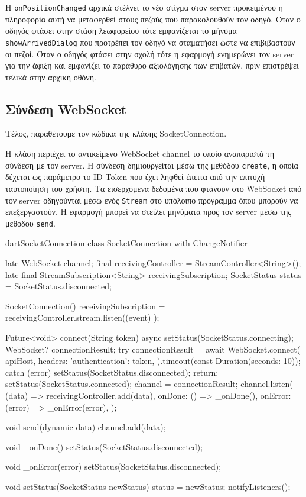 \documentclass[../thesis.tex]{subfiles}
\begin{document}
Η \texttt{on\-Position\-Changed} αρχικά στέλνει το νέο στίγμα στον server προκειμένου η πληροφορία αυτή να μεταφερθεί στους πεζούς που παρακολουθούν τον οδηγό.
Όταν ο οδηγός φτάσει στην στάση λεωφορείου τότε εμφανίζεται το μήνυμα \texttt{show\-Arrived\-Dialog} που προτρέπει τον οδηγό να σταματήσει ώστε να επιβιβαστούν οι πεζοί.
Όταν ο οδηγός φτάσει στην σχολή τότε η εφαρμογή ενημερώνει τον server για την άφιξη και εμφανίζει το παράθυρο αξιολόγησης των επιβατών, πριν επιστρέψει τελικά στην αρχική οθόνη.

\subsection{Σύνδεση WebSocket}

Τέλος, παραθέτουμε τον κώδικα της κλάσης SocketConnection.

\bigskip

Η κλάση περιέχει το αντικείμενο WebSocket channel το οποίο αναπαριστά τη σύνδεση με τον server.
Η σύνδεση δημιουργείται μέσω της μεθόδου \texttt{create}, η οποία δέχεται ως παράμετρο το ID Token που έχει ληφθεί έπειτα από την επιτυχή ταυτοποίηση του χρήστη.
Τα εισερχόμενα δεδομένα που φτάνουν στο WebSocket από τον server οδηγούνται μέσω ενός \texttt{Stream} στο υπόλοιπο πρόγραμμα όπου μπορούν να επεξεργαστούν.
Η εφαρμογή μπορεί να στείλει μηνύματα προς τον server μέσω της μεθόδου \texttt{send}.

\begin{codeblock}{dart}{SocketConnection}
  class SocketConnection with ChangeNotifier {
    late WebSocket channel;
    final receivingController = StreamController<String>();
    late final StreamSubscription<String> receivingSubscription;
    SocketStatus status = SocketStatus.disconnected;
  
    SocketConnection() {
      receivingSubscription = receivingController.stream.listen((event) {});
    }
  
    Future<void> connect(String token) async {
      setStatus(SocketStatus.connecting);
      WebSocket? connectionResult;
      try {
        connectionResult = await WebSocket.connect(
          apiHost,
          headers: {'authentication': token},
        ).timeout(const Duration(seconds: 10));
      } catch (error) {
        setStatus(SocketStatus.disconnected);
        return;
      }
      setStatus(SocketStatus.connected);
      channel = connectionResult;
      channel.listen(
        (data) => receivingController.add(data),
        onDone: () => _onDone(),
        onError: (error) => _onError(error),
      );
    }
  
    void send(dynamic data){
      channel.add(data);
    }

    void _onDone() {
      setStatus(SocketStatus.disconnected);
    }
  
    void _onError(error) {
      setStatus(SocketStatus.disconnected);
    }
  
    void setStatus(SocketStatus newStatus) {
      status = newStatus;
      notifyListeners();
    }
  }  
\end{codeblock}
\end{document}
